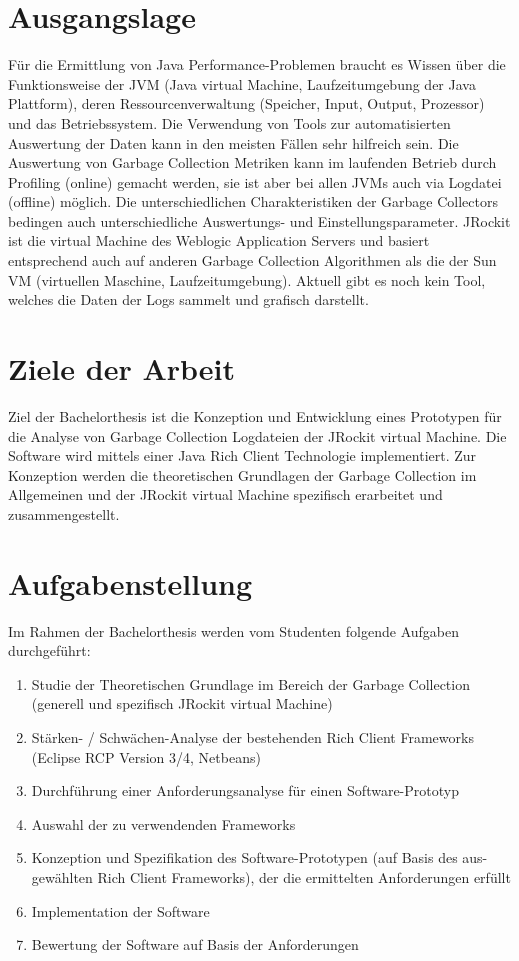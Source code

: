 \section{Ausgangslage}
Für die Ermittlung von Java Performance-Problemen braucht es Wissen über die Funktionsweise der JVM (Java virtual Machine, Laufzeitumgebung der Java Plattform), deren Ressourcenverwaltung (Speicher, Input, Output, Prozessor) und das Betriebssystem. Die Verwendung von Tools zur automatisierten Auswertung der Daten kann in den meisten Fällen sehr hilfreich sein. 
Die Auswertung von Garbage Collection Metriken kann im laufenden Betrieb durch Profiling (online) gemacht werden, sie ist aber bei allen JVMs auch via Logdatei (offline) möglich. Die unterschiedlichen Charakteristiken der Garbage Collectors bedingen auch unterschiedliche Auswertungs- und Einstellungsparameter. 
JRockit ist die virtual Machine des Weblogic Application Servers und basiert entsprechend auch auf anderen Garbage Collection Algorithmen als die der Sun VM (virtuellen Maschine, Laufzeitumgebung). Aktuell gibt es noch kein Tool, welches die Daten der Logs sammelt und grafisch darstellt.


\section{Ziele der Arbeit}
Ziel der Bachelorthesis ist die Konzeption und Entwicklung eines Prototypen für die Analyse von Garbage Collection Logdateien der JRockit virtual Machine. Die Software wird mittels einer Java Rich Client Technologie implementiert. Zur Konzeption werden die theoretischen Grundlagen der Garbage Collection im Allgemeinen und der JRockit virtual Machine spezifisch erarbeitet und zusammengestellt.

\section{Aufgabenstellung}
Im Rahmen der Bachelorthesis werden vom Studenten folgende Aufgaben durchgeführt:

\begin{enumerate}
\item Studie der Theoretischen Grundlage im Bereich der Garbage Collection 
    (generell und spezifisch JRockit virtual Machine)
\item Stärken- / Schwächen-Analyse der bestehenden Rich Client Frameworks
    (Eclipse RCP Version 3/4, Netbeans)
\item Durchführung einer Anforderungsanalyse für einen Software-Prototyp
\item Auswahl der zu verwendenden Frameworks
\item Konzeption und Spezifikation des Software-Prototypen (auf Basis des aus-
    gewählten Rich Client Frameworks), der die ermittelten Anforderungen erfüllt
\item Implementation der Software
\item Bewertung der Software auf Basis der Anforderungen
\end{enumerate}

